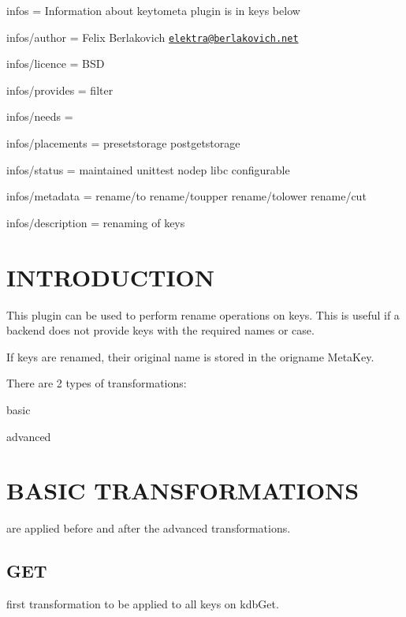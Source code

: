 
\begin{DoxyItemize}
\item infos = Information about keytometa plugin is in keys below
\item infos/author = Felix Berlakovich \href{mailto:elektra@berlakovich.net}{\tt elektra@berlakovich.\+net}
\item infos/licence = B\+S\+D
\item infos/provides = filter
\item infos/needs =
\item infos/placements = presetstorage postgetstorage
\item infos/status = maintained unittest nodep libc configurable
\item infos/metadata = rename/to rename/toupper rename/tolower rename/cut
\item infos/description = renaming of keys
\end{DoxyItemize}\hypertarget{md_src_plugins_rename_README_src_plugins_rename_README_md}{}\section{I\+N\+T\+R\+O\+D\+U\+C\+T\+I\+O\+N}\label{md_src_plugins_rename_README_src_plugins_rename_README_md}
This plugin can be used to perform rename operations on keys. This is useful if a backend does not provide keys with the required names or case.

If keys are renamed, their original name is stored in the {\ttfamily origname} Meta\+Key.

There are 2 types of transformations\+:
\begin{DoxyItemize}
\item basic
\item advanced
\end{DoxyItemize}

\section*{B\+A\+S\+I\+C T\+R\+A\+N\+S\+F\+O\+R\+M\+A\+T\+I\+O\+N\+S}

are applied before and after the advanced transformations.

\subsection*{G\+E\+T}

first transformation to be applied to all keys on kdb\+Get.

